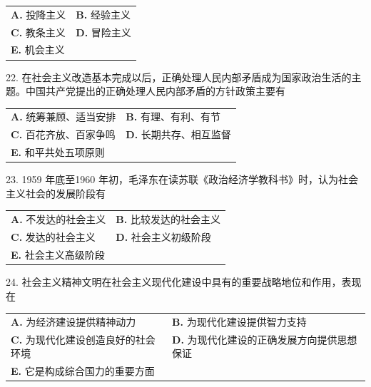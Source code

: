 \documentclass[UTF8,11pt]{ctexart}
\begin{document}
\begin{center}\begin{tabular}{>{\raggedright\arraybackslash}p{\dimexpr(\linewidth-4\tabcolsep)/2\relax}>{\raggedright\arraybackslash}p{\dimexpr(\linewidth-4\tabcolsep)/2\relax}}
\textbf{A.} 投降主义 & \textbf{B.} 经验主义\\[.35em]
\textbf{C.} 教条主义 & \textbf{D.} 冒险主义\\[.35em]
\textbf{E.} 机会主义 & \\[.35em]\end{tabular}\end{center}

22. 在社会主义改造基本完成以后，正确处理人民内部矛盾成为国家政治生活的主题。中国共产党提出的正确处理人民内部矛盾的方针政策主要有


\begin{center}\begin{tabular}{>{\raggedright\arraybackslash}p{\dimexpr(\linewidth-4\tabcolsep)/2\relax}>{\raggedright\arraybackslash}p{\dimexpr(\linewidth-4\tabcolsep)/2\relax}}
\textbf{A.} 统筹兼顾、适当安排 & \textbf{B.} 有理、有利、有节\\[.35em]
\textbf{C.} 百花齐放、百家争鸣 & \textbf{D.} 长期共存、相互监督\\[.35em]
\textbf{E.} 和平共处五项原则 & \\[.35em]\end{tabular}\end{center}

23. 1959 年底至1960 年初，毛泽东在读苏联《政治经济学教科书》时，认为社会主义社会的发展阶段有


\begin{center}\begin{tabular}{>{\raggedright\arraybackslash}p{\dimexpr(\linewidth-4\tabcolsep)/2\relax}>{\raggedright\arraybackslash}p{\dimexpr(\linewidth-4\tabcolsep)/2\relax}}
\textbf{A.} 不发达的社会主义 & \textbf{B.} 比较发达的社会主义\\[.35em]
\textbf{C.} 发达的社会主义 & \textbf{D.} 社会主义初级阶段\\[.35em]
\textbf{E.} 社会主义高级阶段 & \\[.35em]\end{tabular}\end{center}

24. 社会主义精神文明在社会主义现代化建设中具有的重要战略地位和作用，表现在


\begin{center}\begin{tabular}{>{\raggedright\arraybackslash}p{\dimexpr(\linewidth-4\tabcolsep)/2\relax}>{\raggedright\arraybackslash}p{\dimexpr(\linewidth-4\tabcolsep)/2\relax}}
\textbf{A.} 为经济建设提供精神动力 & \textbf{B.} 为现代化建设提供智力支持\\[.35em]
\textbf{C.} 为现代化建设创造良好的社会环境 & \textbf{D.} 为现代化建设的正确发展方向提供思想保证\\[.35em]
\textbf{E.} 它是构成综合国力的重要方面 & \\[.35em]\end{tabular}\end{center}
\end{document}
